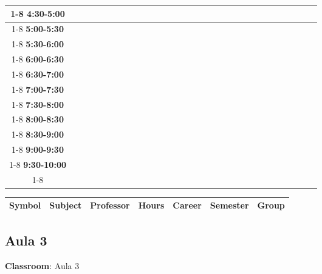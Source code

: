 \documentclass{article}
\begin{document}
\begin{table}[ht]
\begin{tabular}{|c|c|c|c|c|c|c|c|c|c|c|c|c|c|c|c|c|c|c|c|c|c|c|c|c|c|c|c|c|c|}
 \cline{1-8} 
\textbf{4:30-5:00} &   &   &   &   &   &   &   \\
 \cline{1-8} 
\textbf{5:00-5:30} &   &   &   &   &   &   &   \\
 \cline{1-8} 
\textbf{5:30-6:00} &   &   &   &   &   &   &   \\
 \cline{1-8} 
\textbf{6:00-6:30} &   &   &   &   &   &   &   \\
 \cline{1-8} 
\textbf{6:30-7:00} &   &   &   &   &   &   &   \\
 \cline{1-8} 
\textbf{7:00-7:30} &   &   &   &   &   &   &   \\
 \cline{1-8} 
\textbf{7:30-8:00} &   &   &   &   &   &   &   \\
 \cline{1-8} 
\textbf{8:00-8:30} &   &   &   &   &   &   &   \\
 \cline{1-8} 
\textbf{8:30-9:00} &   &   &   &   &   &   &   \\
 \cline{1-8} 
\textbf{9:00-9:30} &   &   &   &   &   &   &   \\
 \cline{1-8} 
\textbf{9:30-10:00} &   &   &   &   &   &   &   \\
 \cline{1-8} 
\end{tabular}\end{table}

        
        \begin{tabular}{|>{\centering\arraybackslash}m{2cm}|>{\centering\arraybackslash}m{4cm}|>{\centering\arraybackslash}m{2.15cm}|>{\centering\arraybackslash}m{1.8cm}|>{\centering\arraybackslash}m{2cm}|>{\centering\arraybackslash}m{2cm}|>{\centering\arraybackslash}m{2cm}|}
        \hline
        \textbf{Symbol} & \textbf{Subject} & \textbf{Professor} & \textbf{Hours} & \textbf{Career} & \textbf{Semester} & \textbf{Group} \\
        \hline
        \end{tabular}
                    

        \newpage
        

        \subsection{Aula 3}
        \vspace*{.1cm}
        
        \begin{flushright}
            {\LARGE \textbf{Classroom}: Aula 3}
        \end{flushright}
        \vspace{1cm}
\end{document}
